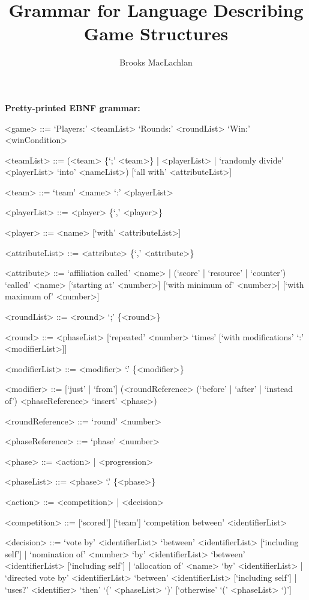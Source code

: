 \documentclass{article}
\title{Grammar for Language Describing Game Structures}
\author{Brooks MacLachlan}
\begin{document}
\maketitle

\noindent \textbf{Pretty-printed EBNF grammar:}
\begin{grammar}
<game> ::= `Players:' <teamList> `Rounds:' <roundList> `Win:' 
<winCondition>

<teamList> ::= (<team> \{`;' <team>\} | <playerList> | `randomly divide' 
<playerList> `into' <nameList>) [`all with' <attributeList>]

<team> ::= `team' <name> `:' <playerList>

<playerList> ::= <player> \{`,' <player>\}

<player> ::= <name> [`with' <attributeList>]

<attributeList> ::= <attribute> \{`,' <attribute>\}

<attribute> ::= `affiliation called' <name> | (`score' | `resource' | 
`counter') `called'
<name> [`starting at' <number>] [`with minimum of' <number>] [`with maximum of' 
<number>]

<roundList> ::= <round> `;' \{<round>\}

<round> ::= <phaseList> [`repeated' <number> `times' [`with modifications' `:' 
<modifierList>]]

<modifierList> ::= <modifier> `.' \{<modifier>\}

<modifier> ::= [`just' | `from'] (<roundReference> (`before' | `after' | 
`instead of') 
<phaseReference> `insert' <phase>)

<roundReference> ::= `round' <number>

<phaseReference> ::= `phase' <number>

<phase> ::= <action> | <progression>

<phaseList> ::= <phase> `.' \{<phase>\}

<action> ::= <competition> | <decision>

<competition> ::= [`scored'] [`team'] `competition between' <identifierList>

<decision> ::= `vote by' <identifierList> `between' 
<identifierList> [`including self'] | `nomination of' <number> `by' 
<identifierList> `between' <identifierList> [`including self'] | 
`allocation of' <name> `by' <identifierList> | `directed vote by'
<identifierList> `between' <identifierList> [`including self'] | `uses?'
<identifier> `then' `(' <phaseList> `)' [`otherwise' `(' <phaseList> `)']


\end{grammar}
\end{document}
